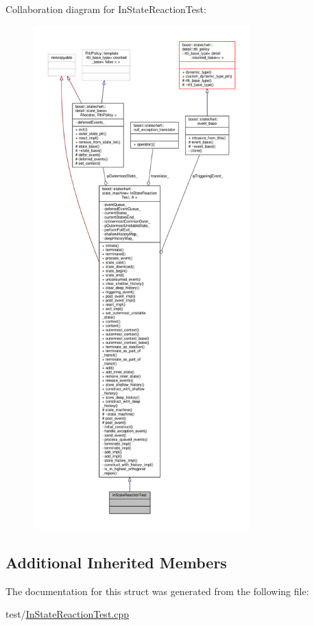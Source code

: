 Collaboration diagram for In\+State\+Reaction\+Test\+:
\nopagebreak
\begin{figure}[H]
\begin{center}
\leavevmode
\includegraphics[height=550pt]{struct_in_state_reaction_test__coll__graph}
\end{center}
\end{figure}
\subsection*{Additional Inherited Members}


The documentation for this struct was generated from the following file\+:\begin{DoxyCompactItemize}
\item 
test/\mbox{\hyperlink{_in_state_reaction_test_8cpp}{In\+State\+Reaction\+Test.\+cpp}}\end{DoxyCompactItemize}
